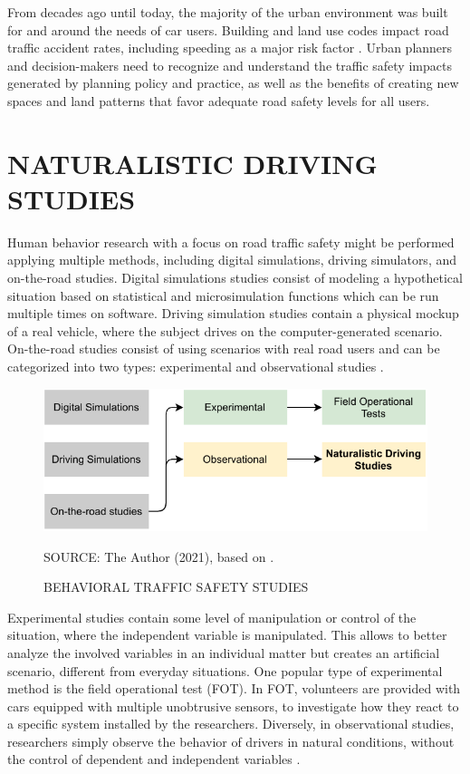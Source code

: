 
From decades ago until today, the majority of the urban environment was built for and around the needs of car users. Building and land use codes impact road traffic accident rates, including speeding as a major risk factor \cite{Knoflacher2016}. Urban planners and decision-makers need to recognize and understand the traffic safety impacts generated by planning policy and practice, as well as the benefits of creating new spaces and land patterns that favor adequate road safety levels for all users. 

\section{NATURALISTIC DRIVING STUDIES} \label{nds}

Human behavior research with a focus on road traffic safety might be performed applying multiple methods, including digital simulations, driving simulators, and on-the-road studies. Digital simulations studies consist of modeling a hypothetical situation based on statistical and microsimulation functions which can be run multiple times on software. Driving simulation studies contain a physical mockup of a real vehicle, where the subject drives on the computer-generated scenario. On-the-road studies consist of using scenarios with real road users and can be categorized into two types: experimental and observational studies \cite{Shinar2017}. 

\begin{figure}[!htbp]
    \centering\footnotesize
    \captionsetup{font=footnotesize}
    \caption{BEHAVIORAL TRAFFIC SAFETY STUDIES}
    \includegraphics{fig/studies.pdf}
    \label{fig:shinar}
    \par SOURCE: The Author (2021), based on \textcite{Shinar2017}.
\end{figure}

Experimental studies contain some level of manipulation or control of the situation, where the independent variable is manipulated. This allows to better analyze the involved variables in an individual matter but creates an artificial scenario, different from everyday situations. One popular type of experimental method is the field operational test (FOT). In FOT, volunteers are provided with cars equipped with multiple unobtrusive sensors, to investigate how they react to a specific system installed by the researchers. Diversely, in observational studies, researchers simply observe the behavior of drivers in natural conditions, without the control of dependent and independent variables \cite{Shinar2017}. 


